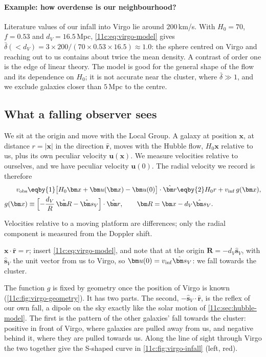 \paragraph{Example: how overdense is our neighbourhood?} Literature values of our
infall into Virgo lie around $200$\,km/s. With $H_0=70$, $f=0.53$ and $d_V=16.5$\,Mpc,
\eqref{11c:eq:virgo-model} gives
$\bar\delta(<d_V)=3\times200/(70\times0.53\times16.5)\approx1.0$: the sphere
centred on Virgo and reaching out to us contains about twice the mean density. A
contrast of order one is the edge of linear theory. The model is good for the
general shape of the flow and its dependence on $H_0$; it is not accurate near the
cluster, where $\bar\delta\gg1$, and we exclude galaxies closer than $5$\,Mpc to the
centre.

\subsection{What a falling observer sees}
\label{11c:sec:infall-observer}

We sit at the origin and move with the Local Group. A galaxy at position $\bm x$, at
distance $r=|\bm x|$ in the direction $\hat{\bm r}$, moves with the Hubble flow,
$H_0\bm x$ relative to us, plus its own peculiar velocity $\bm u(\bm x)$. We
measure velocities relative to ourselves, and we have peculiar velocity $\bm u(0)$.
The radial velocity we record is therefore
\begin{align}
  v_{\rm obs}
  &\eqby{1}\bigl[H_0\bm x+\bm u(\bm x)-\bm u(0)\bigr]\cdot\hat{\bm r}
   \eqby{2}H_0r+v_{\rm inf}\,g(\bm x),
  \nonumber\\
  g(\bm x)
  &\equiv\Bigl[-\frac{d_V}{R}\,\hat{\bm R}-\hat{\bm s}_V\Bigr]\cdot\hat{\bm r},
  \qquad \bm R=\bm x-d_V\hat{\bm s}_V .
  \label{11c:eq:vobs-virgo}
\end{align}
\begin{explain}
  \item Velocities relative to a moving platform are differences; only the radial
        component is measured from the Doppler shift.
  \item $\bm x\cdot\hat{\bm r}=r$; insert \eqref{11c:eq:virgo-model}, and note that at the
        origin $\bm R=-d_V\hat{\bm s}_V$, with $\hat{\bm s}_V$ the unit vector from us to
        Virgo, so $\bm u(0)=v_{\rm inf}\hat{\bm s}_V$: we fall towards the cluster.
\end{explain}
The function $g$ is fixed by geometry once the position of Virgo is known
(\cref{11c:fig:virgo-geometry}). It has two parts. The second, $-\hat{\bm s}_V\cdot\hat{\bm r}$,
is the reflex of our own fall, a dipole on the sky exactly like the solar motion of
\cref{11c:sec:hubble-model}. The first is the pattern of the other galaxies' fall
towards the cluster: positive in front of Virgo, where galaxies are pulled away
from us, and negative behind it, where they are pulled towards us. Along the line
of sight through Virgo the two together give the S-shaped curve in
\cref{11c:fig:virgo-infall} (left, red).

